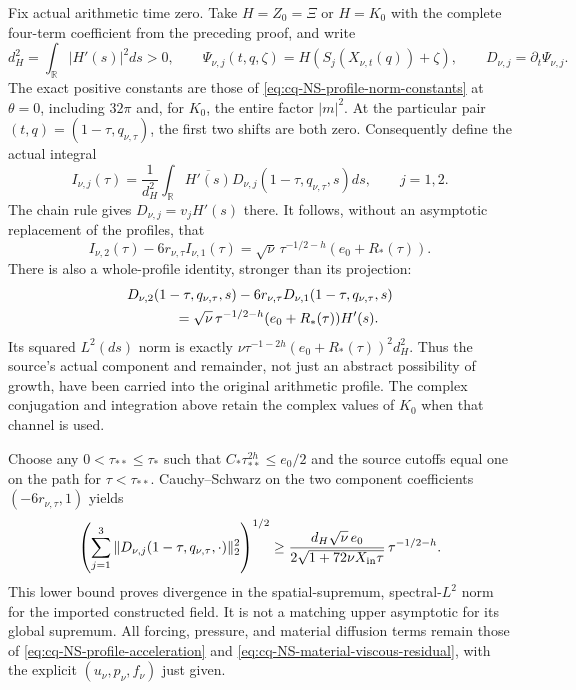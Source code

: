 Fix actual arithmetic time zero. Take $H=Z_0=\Xi$ or $H=K_0$ with
the complete four-term coefficient from the preceding proof, and write
\[
 d_H^2=\int_\mathbb R|H'(s)|^2ds>0,\qquad
 \Psi_{\nu,j}(t,q,\zeta)=H(S_j(X_{\nu,t}(q))+\zeta),
 \qquad D_{\nu,j}=\partial_t\Psi_{\nu,j}.
\]
The exact positive constants are those of \eqref{eq:cq-NS-profile-norm-constants} at $\theta=0$,
including $32\pi$ and, for $K_0$, the entire factor $|m|^2$.
At the particular pair $(t,q)=(1-\tau,q_{\nu,\tau})$, the first two
shifts are both zero. Consequently define the actual integral
\[
 I_{\nu,j}(\tau)=\frac{1}{d_H^2}\int_\mathbb R
       \overline{H'(s)}D_{\nu,j}(1-\tau,q_{\nu,\tau},s)ds,
 \qquad j=1,2.
\]
The chain rule gives $D_{\nu,j}=v_jH'(s)$ there. It follows, without
an asymptotic replacement of the profiles, that
\begin{equation}
 I_{\nu,2}(\tau)-6r_{\nu,\tau}I_{\nu,1}(\tau)
 =\sqrt\nu\,\tau^{-1/2-h}(e_0+R_*(\tau)).
 \label{eq:cq-nw:integralblowup}
\end{equation}
There is also a whole-profile identity, stronger than its projection:
\begin{equation}
 \begin{split}
 &D_{\nu,2}(1-\tau,q_{\nu,\tau},s)
      -6r_{\nu,\tau}D_{\nu,1}(1-\tau,q_{\nu,\tau},s)\\
 &\hspace{12mm}=\sqrt\nu\,\tau^{-1/2-h}
                      (e_0+R_*(\tau))H'(s).
 \end{split}
 \label{eq:cq-nw:profileblowup}
\end{equation}
Its squared $L^2(ds)$ norm is exactly
$\nu\tau^{-1-2h}(e_0+R_*(\tau))^2d_H^2$.
Thus the source's actual component and remainder, not just an abstract
possibility of growth, have been carried into the original arithmetic
profile. The complex conjugation and integration above retain the
complex values of $K_0$ when that channel is used.

Choose any $0<\tau_{**}\leq\tau_*$ such that
$C_*\tau_{**}^{2h}\leq e_0/2$ and the source cutoffs equal one on
the path for $\tau<\tau_{**}$. Cauchy--Schwarz on the two component
coefficients $(-6r_{\nu,\tau},1)$ yields
\begin{equation}
 \left(\sum_{j=1}^3\|D_{\nu,j}
              (1-\tau,q_{\nu,\tau},\cdot)\|_2^2\right)^{1/2}
 \geq
 \frac{d_H\sqrt\nu\,e_0}
      {2\sqrt{1+72\nu X_{\rm in}\tau}}\,
              \tau^{-1/2-h}.
 \label{eq:cq-nw:lower}
\end{equation}
This lower bound proves divergence in the spatial-supremum,
spectral-$L^2$ norm for the imported constructed field. It is not a
matching upper asymptotic for its global supremum. All forcing,
pressure, and material diffusion terms remain those of
\eqref{eq:cq-NS-profile-acceleration} and \eqref{eq:cq-NS-material-viscous-residual}, with the explicit
$(u_\nu,p_\nu,f_\nu)$ just given.

